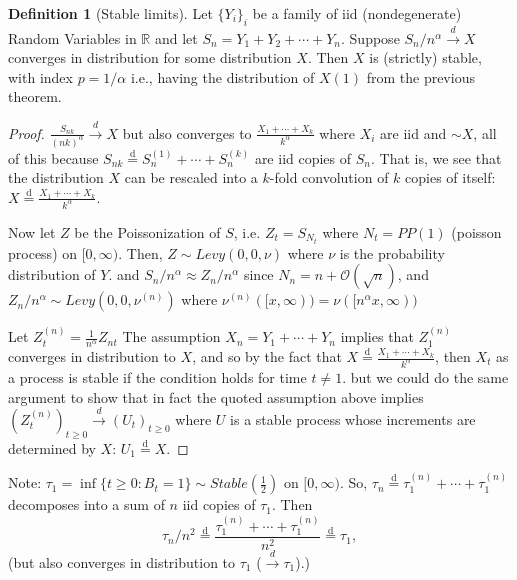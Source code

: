 \documentclass[../../../Master/AppliedStochastics.tex]{subfiles}
\newcommand{\disteq}{\overset{ \text{d} }{=}}
\newcommand{\R}{\mathbb{R}}    %
\theoremstyle{definition}
\newtheorem{defn}[thm]{Definition}
\begin{document}
\begin{defn} [Stable limits] Let $\{Y_i\}_{i} $ be a family of iid (nondegenerate) Random Variables in $\R$ and let $S_n = Y_1 + Y_2 + \cdots + Y_n$. Suppose $S_n / n^\alpha \overset{d}{\longrightarrow} X$ converges in distribution for some distribution $X$. Then $X$ is (strictly) stable, with index $p = 1/\alpha$ i.e., having the distribution of $X(1)$ from the previous theorem.
\end{defn}

\begin{proof}
$\frac{S_{nk}}{ (nk)^{\alpha} } \overset{d}{\longrightarrow} X$ but also converges to $\frac{ X_1 + \cdots + X_k }{k^\alpha}$ where $X_i$ are iid and $\sim X$, all of this because $S_{nk} \disteq S_n ^{(1)} + \cdots + S_n ^{(k)}$ are iid copies of $S_n$. That is, we see that the distribution $X$ can be rescaled into a $k$-fold convolution of $k$ copies of itself: $X \disteq \frac{ X_1 + \cdots + X_k }{k^\alpha}$.

\bigskip{}

Now let $Z$ be the Poissonization of $S$, i.e. $Z_t = S_{N_t}$ where $N_t = PP(1)$ (poisson process) on $[0, \infty)$. Then, $Z \sim Levy (0,0, \nu)$ where $\nu$ is the probability distribution of $Y$. and $S_n / n^\alpha \approx Z_n / n^\alpha$ since $N_n = n + \mathcal{O}(\sqrt{n})$, and $Z_n / n^\alpha \sim Levy(0,0, \nu^{(n)})$ where $\nu^{(n)} ( [x , \infty) ) = \nu( [n^\alpha x, \infty) )$

\bigskip{}

Let $Z^{(n)}_t = \frac{1}{n^\alpha} Z_{nt}$ The assumption $X_n = Y_1 + \cdots + Y_n$ implies that $Z_1 ^{(n)}$ converges in distribution to $X$, and so by the fact that $X \disteq \frac{X_1 + \cdots + X_k}{k^\alpha}$, then $X_t$ as a process is stable if the condition holds for time $t \neq 1$. but we could do the same argument to show that in fact the quoted assumption above implies $(Z_t ^{(n)})_{t \geq 0} \overset{d}{\longrightarrow} (U_t)_{t \geq 0}$ where $U$ is a stable process whose increments are determined by $X$: $U_1 \disteq X$.

\end{proof}

Note: $\tau_1 = \inf \{ t \geq 0 : B_t = 1 \} \sim Stable(\tfrac{1}{2})$ on $[0, \infty)$. So, $\tau_n \disteq \tau_1 ^{(n)} + \cdots + \tau_1 ^{(n)}$ decomposes into a sum of $n$ iid copies of $\tau_1$. Then 
$$
\tau_n / n^2 \disteq \frac{\tau_1 ^{(n)} + \cdots + \tau_1 ^{(n)}}{n^2} \disteq \tau_1,
$$ 
(but also converges in distribution to $\tau_1$ ($\overset{d}{\longrightarrow} \tau_1$).)
\end{document}
